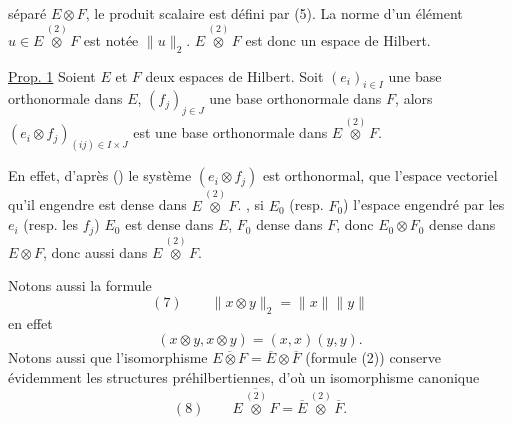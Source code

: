 séparé $E\otimes F$,   le produit scalaire est défini par (5).
La norme d'un élément  $u\in E\overset{(2)}\otimes F$ est notée $\|u\|_2$.
$E\overset{(2)}\otimes F$ est donc un espace de Hilbert.

\uline{Prop. 1} Soient $E$ et $F$ deux espaces de Hilbert. 
Soit $(e_i)_{i\in I}$ une base orthonormale dans $E$, $(f_j)_{j\in J}$ une base orthonormale dans $F$, alors $(e_i\otimes f_j)_{(ij)\in I\times J}$ est une base orthonormale dans $E\overset{(2)}\otimes F$.

En effet, d'après () le système $(e_i\otimes f_j)$ est orthonormal, 
  que l'espace vectoriel qu'il engendre est dense dans $E\overset{(2)}\otimes F$.
, si $E_0$ (resp. $F_0$)   l'espace engendré par les $e_i$ (resp. les $f_j$)  
$E_0$ est dense dans $E$, $F_0$ dense dans $F$, donc $E_0\otimes F_0$ dense dans $E\otimes F$, donc aussi dans $E\overset{(2)}\otimes F$.

Notons aussi la formule
\[
(7)\qquad\boxed{\|x\otimes y\|_2=\|x\|\|y\|}
\]
 en effet  
\[
(x\otimes y,x\otimes y)=(x,x)(y,y).
\]
Notons aussi que l'isomorphisme  $\overline{E\otimes F}=\overline E\otimes\overline F$ (formule (2)) conserve évidemment les structures préhilbertiennes, d'où un isomorphisme canonique
\[
(8)\qquad\overline{E\overset{(2)}\otimes F}=\overline E\overset{(2)}\otimes\overline F.
\]
